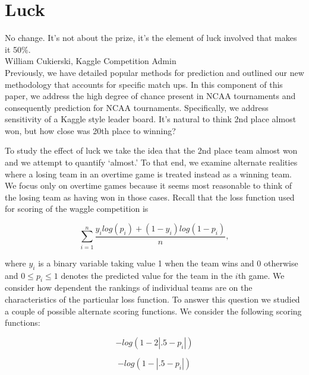 
\section{Luck}
\noindent No change. It's not about the prize, it's the element of luck involved that makes it 50\%.\\
\noindent  William Cukierski, Kaggle Competition Admin \\

Previously, we have detailed popular methods for prediction and outlined our new methodology that accounts for specific match ups. In this component of this paper, we address the high degree of chance present in NCAA tournaments and consequently prediction for NCAA tournaments.  Specifically, we address sensitivity of a Kaggle style leader board. It's natural to think 2nd place almost won, but how close was 20th place to winning? 


To study the effect of luck we take the idea that the 2nd place team almost won and we attempt to quantify `almost.' To that end, we examine alternate realities where a losing team in an overtime game is treated instead as a winning team. We focus only on overtime games because it seems most reasonable to think of the losing team as having won in those cases. Recall that the loss function used for scoring of the waggle competition is

\begin{equation}
\sum_{i=1}^n\frac{y_ilog(p_i)+ (1-y_i)log(1-p_i)}{n},
\end{equation}

where $y_i$ is a binary variable taking value 1 when the team wins and 0 otherwise and $0 \leq p_i \leq 1$ denotes the predicted value for the team in the $i$th game. We consider how dependent the rankings of individual teams are on the characteristics of the particular loss function. To answer this question we studied a couple of possible alternate scoring functions. We consider the following scoring functions: 
 
\begin{equation}\label{eqn:first_score_function}
-log(1-2|.5-p_i|)
\end{equation} 

\begin{equation}\label{eqn:second_score_function}
-log(1-|.5-p_i|)
\end{equation} 

